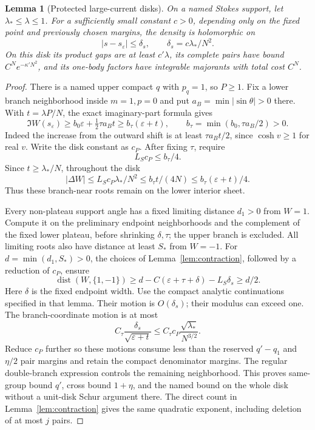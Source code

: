 \documentclass[11pt]{article}
\numberwithin{equation}{section}
\newtheorem{lemma}[theorem]{Lemma}
\theoremstyle{definition}
\newcommand{\eps}{\varepsilon}
\begin{document}
\begin{lemma}[Protected large-current disks]\label{lem:protected}
On a named Stokes support, let \(\lambda_*\le\lambda\le1\).
For a sufficiently small constant \(c>0\), depending only on
the fixed point and previously chosen margins, the density is
holomorphic on
\[
 |s-s_\eps|\le\delta_s,\qquad \delta_s=c\lambda_*/N^2 .
\]
On this disk its product gaps are at least \(c'\lambda\),
its complete pairs have bound \(C^Ne^{-\kappa' N^2}\), and its
one-body factors have integrable majorants with total cost \(C^N\).
\end{lemma}
\begin{proof}
There is a named upper compact \(q\) with \(p_q=1\), so
\(P\ge1\). Fix a lower branch neighborhood inside \(m=1,p=0\)
and put \(a_B=\min|\sin\theta|>0\) there. With
\(t=\lambda P/N\), the exact imaginary-part formula gives
\[
 \Im W(s_\eps)\ge b_0\eps+\tfrac12\tau a_Bt
 \ge b_\tau(\eps+t),\qquad
 b_\tau=\min(b_0,\tau a_B/2)>0.
\]
Indeed the increase from the outward shift is at least
\(\tau a_Bt/2\), since \(\cosh v\ge1\) for real \(v\).
Write the disk constant as \(c_P\). After fixing \(\tau\), require
\[
 L_Sc_P\le b_\tau/4.
\]
Since \(t\ge\lambda_*/N\), throughout the disk
\[
 |\Delta W|\le L_Sc_P\lambda_*/N^2
 \le b_\tau t/(4N)\le b_\tau(\eps+t)/4.
\]
Thus these branch-near roots remain on the lower interior sheet.

Every non-plateau support angle has a fixed limiting distance
\(d_1>0\) from \(W=1\). Compute it on the preliminary endpoint
neighborhoods and the complement of the fixed lower plateau,
before shrinking \(\delta,\tau\); the upper branch is excluded.
All limiting
roots also have distance at least \(S_*\) from \(W=-1\).
For \(d=\min(d_1,S_*)>0\), the choices of
Lemma~\ref{lem:contraction}, followed by a reduction of \(c_P\),
ensure
\[
 \operatorname{dist}(W,\{1,-1\})
 \ge d-C(\eps+\tau+\delta)-L_S\delta_s\ge d/2.
\]
Here \(\delta\) is the fixed endpoint width.
Use the compact analytic continuations specified in that lemma.
Their motion is \(O(\delta_s)\); their modulus can exceed one.
The branch-coordinate motion is at most
\[
 C_\tau\frac{\delta_s}{\sqrt{\eps+t}}
 \le C_\tau c_P\frac{\sqrt{\lambda_*}}{N^{3/2}}.
\]
Reduce \(c_P\) further so these motions consume less than
the reserved \(q'-q_1\) and \(\eta/2\) pair margins and retain
the compact denominator margins. The regular double-branch
expression controls the remaining neighborhood. This proves
same-group bound \(q'\), cross bound \(1+\eta\), and the named
bound on the whole disk without a unit-disk Schur argument there.
The direct count in Lemma~\ref{lem:contraction} gives the same
quadratic exponent, including deletion of at most \(j\) pairs.


\end{proof}
\end{document}
